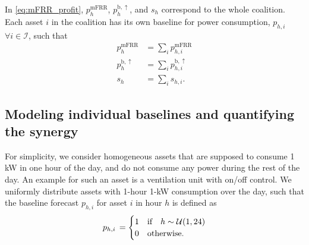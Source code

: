 \documentclass[conference]{IEEEtran}
\begin{document}

In \eqref{eq:mFRR_profit}, $p^{\text{mFRR}}_{h}$, $p^{\text{b},\uparrow}_{h}$, and $s_{h}$ correspond to the whole coalition. Each asset $i$ in the coalition has its own baseline for power consumption, $p_{h, i}$ $\forall{i} \in \mathcal{I}$, such that
%
\begin{subequations} \label{con}
    \begin{align}
        p^{\text{mFRR}}_{h}        & = \sum_{i} p^{\text{mFRR}}_{h, i}       \\
        p^{\text{b}, \uparrow}_{h} & = \sum_{i}p^{\text{b}, \uparrow}_{h, i} \\
        s_{h}                      & = \sum_{i} s_{h, i}.
    \end{align}
\end{subequations}
%



\subsection{Modeling individual baselines and quantifying the synergy}
For simplicity, we consider homogeneous assets that are supposed to consume 1 kW in one hour of the day, and do not consume any power during the rest of the day. An example for such an asset is a ventilation unit with on/off control. We uniformly distribute assets with 1-hour 1-kW consumption over the day, such that the baseline forecast $p_{h, i}$ for asset $i$ in hour $h$ is defined as
%
\begin{align}\label{eq:uniform}
    p_{h,i} \thinspace = \begin{cases}
                             1 & \text{if} \quad h  \sim \mathcal{U}(1,24) \\
                             0 & \text{otherwise.}
                         \end{cases}
\end{align}
\end{document}
